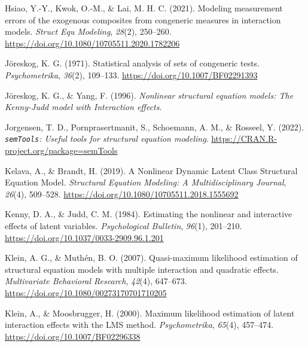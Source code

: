 \documentclass[
  man]{apa6}
\newlength{\cslhangindent}
\newlength{\cslentryspacingunit} %
\newenvironment{CSLReferences}[2] %
 {%
  \setlength{\parindent}{0pt}
  \ifodd #1
  \let\oldpar\par
  \def\par{\hangindent=\cslhangindent\oldpar}
  \fi
  \setlength{\parskip}{#2\cslentryspacingunit}
 }%
 {}
\begin{document}
\begin{CSLReferences}{1}{0}
\leavevmode{}%
Hsiao, Y.-Y., Kwok, O.-M., \& Lai, M. H. C. (2021). Modeling measurement errors of the exogenous composites from congeneric measures in interaction models. \emph{Struct Equ Modeling}, \emph{28}(2), 250--260. \url{https://doi.org/10.1080/10705511.2020.1782206}

\leavevmode{}%
Jöreskog, K. G. (1971). Statistical analysis of sets of congeneric tests. \emph{Psychometrika}, \emph{36}(2), 109--133. \url{https://doi.org/10.1007/BF02291393}

\leavevmode{}%
Jöreskog, K. G., \& Yang, F. (1996). \emph{Nonlinear structural equation models: {The Kenny-Judd} model with {Interaction} effects}.

\leavevmode{}%
Jorgensen, T. D., Pornprasertmanit, S., Schoemann, A. M., \& Rosseel, Y. (2022). \emph{\texttt{semTools}: {U}seful tools for structural equation modeling}. \url{https://CRAN.R-project.org/package=semTools}

\leavevmode{}%
Kelava, A., \& Brandt, H. (2019). A {Nonlinear Dynamic Latent Class Structural Equation Model}. \emph{Structural Equation Modeling: A Multidisciplinary Journal}, \emph{26}(4), 509--528. \url{https://doi.org/10.1080/10705511.2018.1555692}

\leavevmode{}%
Kenny, D. A., \& Judd, C. M. (1984). Estimating the nonlinear and interactive effects of latent variables. \emph{Psychological Bulletin}, \emph{96}(1), 201--210. \url{https://doi.org/10.1037/0033-2909.96.1.201}

\leavevmode{}%
Klein, A. G., \& Muthén, B. O. (2007). Quasi-maximum likelihood estimation of structural equation models with multiple interaction and quadratic effects. \emph{Multivariate Behavioral Research}, \emph{42}(4), 647--673. \url{https://doi.org/10.1080/00273170701710205}

\leavevmode{}%
Klein, A., \& Moosbrugger, H. (2000). Maximum likelihood estimation of latent interaction effects with the {LMS} method. \emph{Psychometrika}, \emph{65}(4), 457--474. \url{https://doi.org/10.1007/BF02296338}


\end{CSLReferences}
\end{document}
